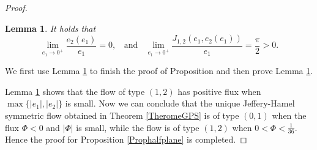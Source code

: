 \documentclass[reqno,12pt]{amsart}
\newtheorem{lemma}[theorem]{Lemma}
\begin{document}
\begin{proof}
\begin{lemma}\label{Lemmahalfspace-2}
    It holds that 
    \begin{equation*}
     \lim_{e_1\to 0^+} \frac{e_2(e_1) }{e_1} = 0, \ \ \ \ \mbox{and}\ \ \ \     \lim_{e_1\to 0^+} \frac{J_{1,2}(e_1, e_2(e_1))}{e_1} =\frac{\pi}{2}>0.  
    \end{equation*}
\end{lemma}

We first use Lemma \ref{Lemmahalfspace-2} to finish the proof of Proposition  and then prove Lemma \ref{Lemmahalfspace-2}.

Lemma \ref{Lemmahalfspace-2} shows that the flow of type $(1, 2)$ has positive flux when $ \max\{|e_1|, |e_2|\} $ is small. Now we can conclude that the unique Jeffery-Hamel symmetric flow obtained in Theorem \ref{TheromeGPS} is of type $(0, 1)$ when the flux $\Phi<0$ and $|\Phi|$ is small, while the flow is of type $(1, 2)$ when $0< \Phi < \frac{1}{36}$. Hence the proof for Proposition \ref{Prophalfplane} is completed. 
\end{proof}
\end{document}

